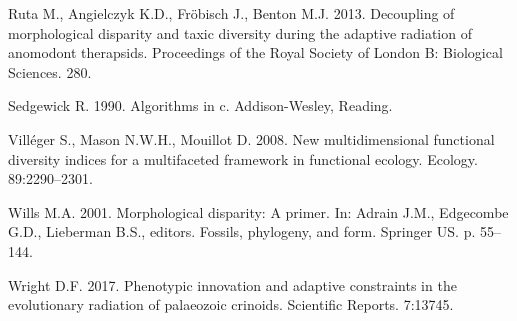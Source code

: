 \documentclass[]{article}
\begin{document}
\hypertarget{ref-ruta2013}{}
Ruta M., Angielczyk K.D., Fröbisch J., Benton M.J. 2013. Decoupling of
morphological disparity and taxic diversity during the adaptive
radiation of anomodont therapsids. Proceedings of the Royal Society of
London B: Biological Sciences. 280.

\hypertarget{ref-sedgewick1990}{}
Sedgewick R. 1990. Algorithms in c. Addison-Wesley, Reading.

\hypertarget{ref-villuxe9ger2008}{}
Villéger S., Mason N.W.H., Mouillot D. 2008. New multidimensional
functional diversity indices for a multifaceted framework in functional
ecology. Ecology. 89:2290--2301.

\hypertarget{ref-wills2001}{}
Wills M.A. 2001. Morphological disparity: A primer. In: Adrain J.M.,
Edgecombe G.D., Lieberman B.S., editors. Fossils, phylogeny, and form.
Springer US. p. 55--144.

\hypertarget{ref-wright2017}{}
Wright D.F. 2017. Phenotypic innovation and adaptive constraints in the
evolutionary radiation of palaeozoic crinoids. Scientific Reports.
7:13745.
\end{document}

